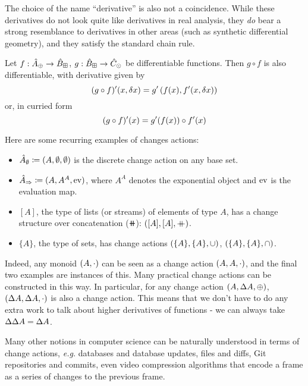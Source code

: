The choice of the name ``derivative'' is also not a coincidence. While these
derivatives do not look quite like derivatives in real analysis, they \emph{do}
bear a strong resemblance to derivatives in other areas (such as synthetic differential geometry), and
they satisfy the standard chain rule.

\begin{thm}
  Let $f: \hat{A}_\oplus \rightarrow \hat{B}_\boxplus$, $g: \hat{B}_\boxplus \rightarrow \hat{C}_\odot$ be differentiable functions. Then $g \circ f$ is also
  differentiable, with derivative given by
  \begin{displaymath}
    (g \circ f)'(x, \delta x) = g'\left(f(x), f'(x, \delta x)\right)
  \end{displaymath}
  or, in curried form
  \begin{displaymath}
    (g \circ f)'(x) = g'(f(x)) \circ f'(x)
  \end{displaymath}
\end{thm}

Here are some recurring examples of changes actions:
\begin{itemize}
  \item $\hat{A}_\emptyset \coloneqq (A,\emptyset,\emptyset)$ is the discrete change action on any base set.
  \item $\hat{A}_\Rightarrow \coloneqq (A,A^A,\operatorname{ev})$, where $A^A$ denotes the exponential object and $\operatorname{ev}$ is the evaluation map.
  \item $[A]$, the type of lists (or streams) of elements of type $A$, has a
    change structure over concatenation ($\doubleplus$): $([A],[A],\mathbin{+\mkern-10mu+})$.
  \item $\{A\}$, the type of sets, has change actions $(\{A\},\{A\},\cup)$, $(\{A\},\{A\},\cap)$.
\end{itemize}

Indeed, any monoid $(A, \cdot)$ can be seen as a change action
$(A,A,\cdot)$, and the final two examples are instances of this. Many practical change actions
can be constructed in this way. In particular, for any change action $(A,\Delta A,\oplus)$,
$(\Delta A,\Delta A,\cdot)$ is also a change action. This means
that we don't have to do any extra work to talk about higher derivatives of
functions - we can always take $\Delta \Delta A = \Delta A$.

Many other notions in computer science can be naturally understood in terms of change actions, \emph{e.g.} databases
and database updates, files and diffs, Git repositories and commits, even video compression
algorithms that encode a frame as a series of changes to the previous frame.

